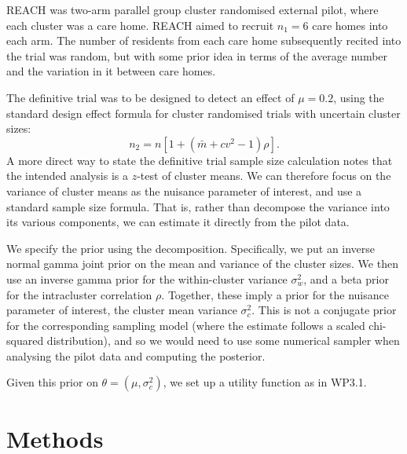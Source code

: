 \documentclass[sagev, Crown]{sagej} %
\begin{document}
REACH was two-arm parallel group cluster randomised external pilot, where each cluster was a care home. REACH aimed to recruit $n_1 = 6$ care homes into each arm. The number of residents from each care home subsequently recited into the trial was random, but with some prior idea in terms of the average number and the variation in it between care homes. 

The definitive trial was to be designed to detect an effect of $\mu = 0.2$, using the standard design effect formula for cluster randomised trials with uncertain cluster sizes:
$$
n_2 = n [1 + (\bar{m} + cv^2 - 1)\rho].
$$
A more direct way to state the definitive trial sample size calculation notes that the intended analysis is a $z$-test of cluster means. We can therefore focus on the variance of cluster means as the nuisance parameter of interest, and use a standard sample size formula. That is, rather than decompose the variance into its various components, we can estimate it directly from the pilot data.

We specify the prior using the decomposition. Specifically, we put an inverse normal gamma joint prior on the mean and variance of the cluster sizes. We then use an inverse gamma prior for the within-cluster variance $\sigma_w^2$, and a beta prior for the intracluster correlation $\rho$. Together, these imply a prior for the nuisance parameter of interest, the cluster mean variance $\sigma^2_c$. This is not a conjugate prior for the corresponding sampling model (where the estimate follows a scaled chi-squared distribution), and so we would need to use some numerical sampler when analysing the pilot data and computing the posterior.

Given this prior on $\theta = (\mu, \sigma_c^2)$, we set up a utility function as in WP3.1.

\section{Methods}
\end{document}
